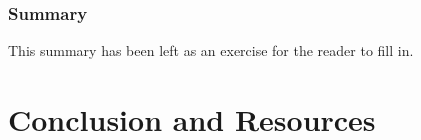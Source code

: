 \section{Summary}

This summary has been left as an exercise for the reader to fill in.


%

\printbibliography[segment=\therefsegment, heading=subbibliography]


\part{Conclusion and Resources}



